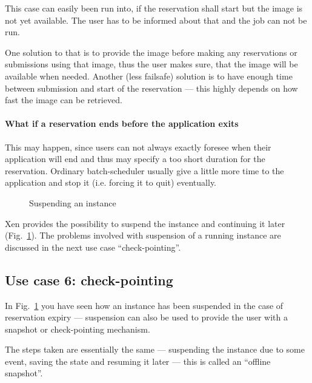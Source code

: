This case can easily been run into, if the reservation shall start but the
image is not yet available. The user has to be informed about that and the
job can not be run.

One  solution  to  that  is   to  provide  the  image  before  making  any
reservations or  submissions using that  image, thus the user  makes sure,
that  the image  will be  available when  needed. Another  (less failsafe)
solution  is to  have  enough time  between  submission and  start of  the
reservation  ---  this  highly  depends  on  how fast  the  image  can  be
retrieved.

\paragraph{What if a reservation ends before the application exits}

This may  happen, since  users can not  always exactly foresee  when their
application will  end and thus  may specify a  too short duration  for the
reservation.  Ordinary batch-scheduler usually  give a little more time to
the application and stop it (i.e.  forcing it to quit) eventually.

\begin{figure}[htbp]
  \begin{center}
  \end{center}
  \caption{Suspending an instance}
  \label{fig:seq-advance-reservation-4}
\end{figure}

Xen provides  the possibility  to suspend the  instance and  continuing it
later  (Fig.~\ref{fig:seq-advance-reservation-4}).  The  problems involved
with suspension of  a running instance are discussed in  the next use case
``check-pointing''.


\subsection{Use case 6: check-pointing}

In Fig.~\ref{fig:seq-advance-reservation-4} you  have seen how an instance
has been  suspended in the case  of reservation expiry  --- suspension can
also    be    used    to    provide    the   user    with    a    snapshot
\cite{distributed-snapshots} or check-pointing mechanism.

The steps taken  are essentially the same ---  suspending the instance due
to some event,  saving the state and resuming it later  --- this is called
an ``offline snapshot''.

